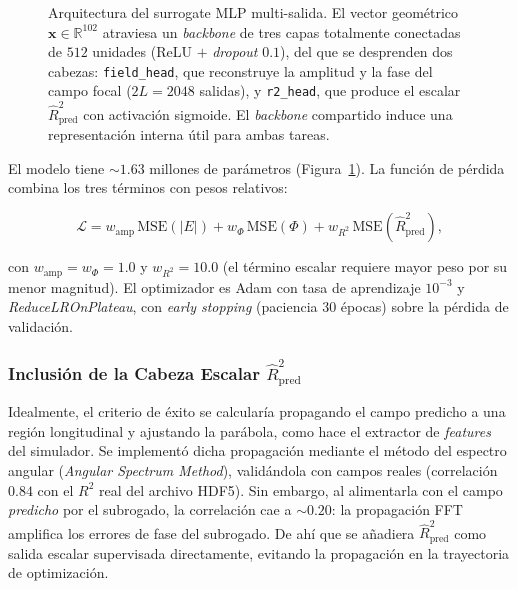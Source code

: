 \begin{figure}[H]
    \centering
    \resizebox{\textwidth}{!}{}
    \caption{Arquitectura del surrogate MLP multi-salida. El vector geométrico
    $\mathbf{x}\in\mathbb{R}^{102}$ atraviesa un \textit{backbone} de tres capas totalmente conectadas de $512$ unidades (ReLU $+$ \textit{dropout} $0.1$), del que se desprenden dos cabezas: \texttt{field\_head}, que reconstruye la amplitud y la fase del campo focal ($2L=2048$ salidas), y \texttt{r2\_head}, que produce el escalar $\hat{R}^2_{\text{pred}}$ con activación sigmoide. El \textit{backbone} compartido
    induce una representación interna útil para ambas tareas.}
    \label{fig:mlp_arquitectura}
\end{figure}

El modelo tiene ${\sim}1.63$ millones de parámetros (Figura~\ref{fig:mlp_arquitectura}). La función de pérdida combina los tres términos con pesos relativos:

\begin{equation}
    \mathcal{L} = w_{\text{amp}}\,\text{MSE}(|E|) + w_{\Phi}\,\text{MSE}(\Phi)
    + w_{R^2}\,\text{MSE}(\hat{R}^2_{\text{pred}}),
    \label{eq:loss_mvp}
\end{equation}

\noindent con $w_{\text{amp}} = w_{\Phi} = 1.0$ y $w_{R^2} = 10.0$ (el término escalar requiere mayor peso por su menor magnitud). El optimizador es Adam con tasa de aprendizaje $10^{-3}$ y \textit{ReduceLROnPlateau}, con \textit{early stopping} (paciencia 30 épocas) sobre la pérdida de validación.

\subsubsection[Inclusión de la Cabeza Escalar R2 Predicha]{Inclusión de la Cabeza Escalar $\hat{R}^2_{\text{pred}}$}\label{subsubsec:r2head}

Idealmente, el criterio de éxito se calcularía propagando el campo predicho a una región longitudinal y ajustando la parábola, como hace el extractor de \textit{features} del simulador. Se implementó dicha propagación mediante el método del espectro angular (\textit{Angular Spectrum Method}), validándola con campos reales (correlación $0.84$ con el $R^2$ real del archivo HDF5). Sin embargo, al alimentarla con el campo \textit{predicho} por el subrogado, la correlación cae a ${\sim}0.20$: la propagación FFT amplifica los errores de fase del subrogado. De ahí que se añadiera $\hat{R}^2_{\text{pred}}$ como salida escalar supervisada directamente, evitando la propagación en la trayectoria de optimización.

